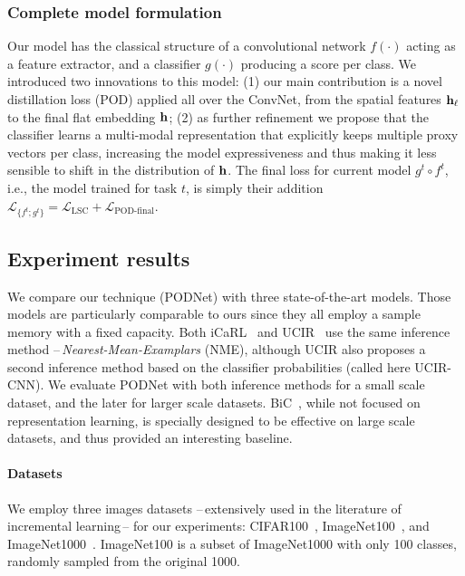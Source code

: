\subsubsection{Complete model formulation}
\label{sec:podnet_modelsummary}

Our model has the classical structure of a convolutional network $f(\cdot)$ acting as a feature
extractor, and a classifier $g(\cdot)$ producing a score per class. We introduced two innovations to
this model: (1) our main contribution is a novel distillation loss (POD) applied all over the
ConvNet, from the spatial features $\mathbf{h}_\ell$ to the final flat embedding $\mathbf{h}$; (2) as further
refinement we propose that the classifier learns a multi-modal representation that explicitly keeps
multiple proxy vectors per class, increasing the model expressiveness and thus making it less
sensible to shift in the distribution of $\mathbf{h}$. The final loss for current model $g^t \circ f^t$,
i.e., the model trained for task $t$, is simply their addition $\mathcal{L}_{\{f^t; g^t\}} =
    \mathcal{L}_\textrm{LSC} + \mathcal{L}_\textrm{POD-final}$.

\subsection{Experiment results}
\label{sec:podnet_exp}

We compare our technique (PODNet) with three state-of-the-art models. Those models are particularly
comparable to ours since they all employ a sample memory with a fixed capacity. Both
iCaRL~\citep{rebuffi2017icarl} and UCIR~\citep{hou2019ucir} use the same inference method
--\,\textit{Nearest-Mean-Examplars} (NME), although UCIR also proposes a second inference method
based on the classifier probabilities (called here UCIR-CNN). We evaluate PODNet with both inference
methods for a small scale dataset, and the later for larger scale datasets.
BiC~\citep{wu2019bias_correction}, while not focused on representation learning, is specially
designed to be effective on large scale datasets, and thus provided an interesting baseline.

\paragraph{Datasets} We employ three images datasets --\,extensively used in the literature of
incremental learning\,-- for our experiments: CIFAR100~\citep{krizhevskycifar100},
ImageNet100~\citep{deng2009imagenet,hou2019ucir,wu2019bias_correction}, and
ImageNet1000~\citep{deng2009imagenet}. ImageNet100 is a subset of ImageNet1000 with only 100
classes, randomly sampled from the original 1000.

